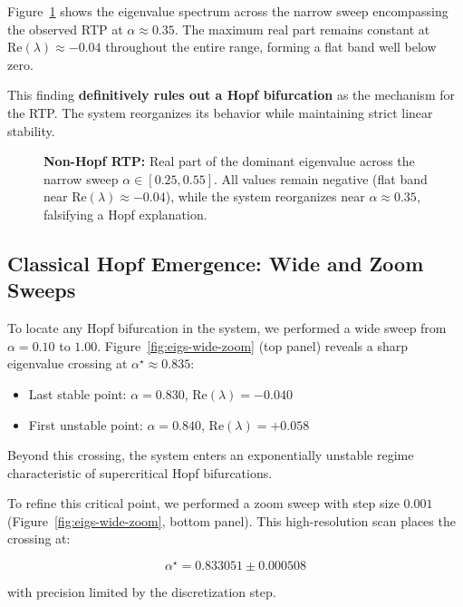 \documentclass[11pt,twocolumn]{article}
\begin{document}
Figure~\ref{fig:eigs-narrow} shows the eigenvalue spectrum across the narrow sweep encompassing the observed
RTP at $\alpha \approx 0.35$. The maximum real part remains constant at $\mathrm{Re}(\lambda) \approx -0.04$
throughout the entire range, forming a flat band well below zero.

This finding \textbf{definitively rules out a Hopf bifurcation} as the mechanism for the RTP. The system
reorganizes its behavior while maintaining strict linear stability.

\begin{figure}[t]
  \centering
  
  \caption{%
  \textbf{Non-Hopf RTP:} Real part of the dominant eigenvalue across the narrow sweep
  $\alpha\in[0.25,0.55]$. All values remain negative (flat band near $\mathrm{Re}(\lambda)\approx -0.04$),
  while the system reorganizes near $\alpha\approx0.35$, falsifying a Hopf explanation.
  }
  \label{fig:eigs-narrow}
\end{figure}

\subsection{Classical Hopf Emergence: Wide and Zoom Sweeps}

To locate any Hopf bifurcation in the system, we performed a wide sweep from $\alpha = 0.10$ to $1.00$.
Figure~\ref{fig:eigs-wide-zoom} (top panel) reveals a sharp eigenvalue crossing at $\alpha^\star \approx 0.835$:

\begin{itemize}
  \item Last stable point: $\alpha = 0.830$, $\mathrm{Re}(\lambda) = -0.040$
  \item First unstable point: $\alpha = 0.840$, $\mathrm{Re}(\lambda) = +0.058$
\end{itemize}

Beyond this crossing, the system enters an exponentially unstable regime characteristic of supercritical
Hopf bifurcations.

To refine this critical point, we performed a zoom sweep with step size $0.001$ (Figure~\ref{fig:eigs-wide-zoom},
bottom panel). This high-resolution scan places the crossing at:

\begin{equation}
  \alpha^\star = 0.833051 \pm 0.000508
\end{equation}

with precision limited by the discretization step.
\end{document}
